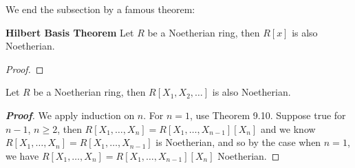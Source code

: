 We end the subsection by a famous theorem:
\begin{theorem}{\bf Hilbert Basis Theorem}\label{H;Hilbert}
Let $R$ be a Noetherian ring, then $R[x]$ is also Noetherian.
\end{theorem}
\begin{proof}
\end{proof}
\begin{corollary} Let $R$ be a Noetherian ring, then $R[X_1,X_2,\ldots]$ is also Noetherian.
\end{corollary}
\begin{proof}[\bf Proof] We apply induction on $n$. For $n=1$, use Theorem 9.10. Suppose true for $n-1$, $n \ge 2$, then $R[X_1,\ldots,X_n]=R[X_1,\ldots,X_{n-1}][X_n]$ and we know $R[X_1,\ldots,X_n]=R[X_1,\ldots,X_{n-1}]$ is Noetherian, and so by the case when $n=1$, we have $R[X_1,\ldots,X_n]=R[X_1,\ldots,X_{n-1}][X_n]$ Noetherian.
\end{proof}

